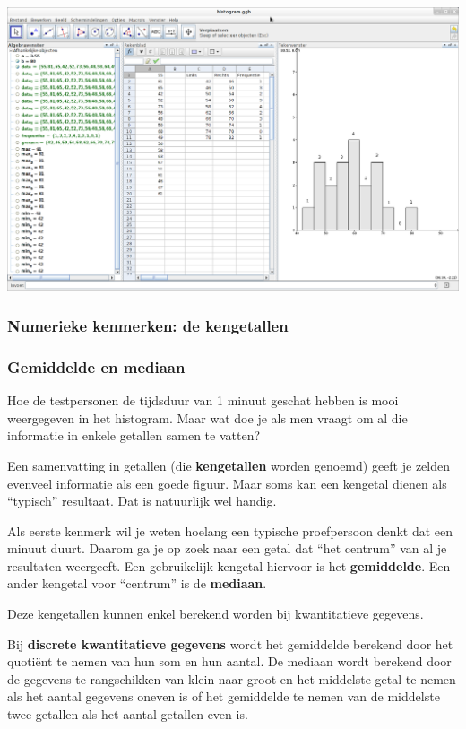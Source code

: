 \documentclass[11pt]{article}
\begin{document}
\begin{center}
  \includegraphics[width=14cm]{gg-histogram}
\end{center}

\subsubsection{Numerieke kenmerken: de kengetallen}

\subsubsection*{Gemiddelde en mediaan}

Hoe de testpersonen de tijdsduur van 1 minuut geschat hebben is mooi weergegeven
in het histogram. Maar wat doe je als men vraagt om al die informatie in enkele
getallen samen te vatten?

Een samenvatting in getallen (die {\bf kengetallen} worden genoemd) geeft je zelden evenveel
informatie als een goede figuur. Maar soms kan een kengetal dienen als “typisch” resultaat. Dat is
natuurlijk wel handig.

Als eerste kenmerk wil je weten hoelang een typische proefpersoon denkt dat een minuut duurt.
Daarom ga je op zoek naar een getal dat “het centrum” van al je resultaten weergeeft. Een
gebruikelijk kengetal hiervoor is het {\bf gemiddelde}. Een ander kengetal voor “centrum” is de
{\bf mediaan}.

Deze kengetallen kunnen enkel berekend worden bij kwantitatieve gegevens.

Bij {\bf discrete kwantitatieve gegevens} wordt het gemiddelde berekend door het quotiënt te nemen van hun som en hun aantal. De mediaan wordt berekend door de gegevens te rangschikken van klein naar groot en het middelste getal te nemen als het aantal gegevens oneven is of het gemiddelde te nemen van de middelste twee getallen als het aantal getallen even is.
\end{document}
